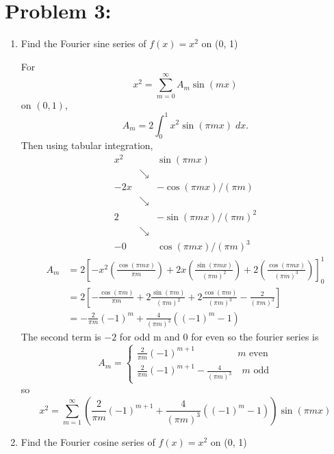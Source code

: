 \documentclass[12pt]{article}
\begin{document}
\color{black}

\pagebreak
\section*{Problem 3:}
\begin{enumerate}
    \item Find the Fourier sine series of $f(x) = x^2$ on (0, 1)
    
    \color{blue}
    For 
    \[x^2 = \sum_{m=0}^\infty A_m\sin(mx)\]
    on $(0, 1)$, 
    \[A_m = 2 \int_0^1 x^2 \sin(\pi mx)\; dx.\]
    Then using tabular integration, 
    \[\begin{array}{ccc}
        x^2 & & \sin(\pi mx)\\
        & \searrow & \\
        -2x & & -\cos(\pi mx)/(\pi m)\\
        & \searrow & \\
        2 & & -\sin(\pi mx)/(\pi m)^2\\
        & \searrow & \\
        -0 & & \cos(\pi mx)/(\pi m)^3 
    \end{array}\]
    \begin{align*}
        A_m &= 2\left[-x^2 \left(\frac{\cos(\pi mx)}{\pi m}\right) + 2x\left(\frac{\sin(\pi mx)}{(\pi m)^2}\right) + 2\left(\frac{\cos(\pi mx)}{(\pi m)^3}\right)\right]_0^1\\
        &= 2\left[-\frac{\cos(\pi m)}{\pi m} + 2\frac{\sin(\pi m)}{(\pi m)^2} + 2\frac{\cos(\pi m)}{(\pi m)^3} - \frac{2}{(\pi m)^3}\right]\\
        &= -\frac{2}{\pi m}(-1)^m + \frac{4}{(\pi m)^3}((-1)^m - 1)
    \end{align*}
    The second term is $-2$ for odd m and $0$ for even so the fourier series is 
    \[A_m = \begin{cases}
        \frac{2}{\pi m}(-1)^{m+1}\qquad \qquad \; \,m \text{ even}\\
        \frac{2}{\pi m}(-1)^{m+1} - \frac{4}{(\pi m )^3} \quad m \text{ odd}
    \end{cases}\]
    so
    \[\boxed{x^2 = \sum_{m=1}^\infty \left(\frac{2}{\pi m}(-1)^{m+1} + \frac{4}{(\pi m)^3}((-1)^m - 1)\right)\sin(\pi mx)}\]

    \color{black}
    \item Find the Fourier cosine series of $f(x) = x^2$ on (0, 1)
    

\end{enumerate}
\end{document}
